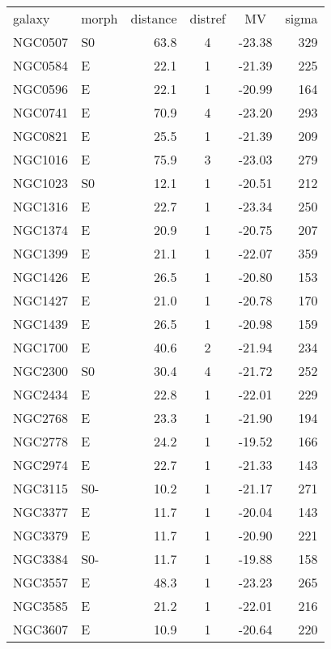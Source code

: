 \begin{tabular}{llrccr}
galaxy  &  morph  &  distance  &  distref  &  MV  &  sigma \\
NGC0507        & S0     &  63.8 & 4 &  -23.38 & 329\\
NGC0584        & E      &  22.1 & 1 &  -21.39 & 225\\
NGC0596        & E      &  22.1 & 1 &  -20.99 & 164\\
NGC0741        & E      &  70.9 & 4 &  -23.20 & 293\\
NGC0821        & E      &  25.5 & 1 &  -21.39 & 209\\
NGC1016        & E      &  75.9 & 3 &  -23.03 & 279\\
NGC1023        & S0     &  12.1 & 1 &  -20.51 & 212\\
NGC1316        & E      &  22.7 & 1 &  -23.34 & 250\\
NGC1374        & E      &  20.9 & 1 &  -20.75 & 207\\
NGC1399        & E      &  21.1 & 1 &  -22.07 & 359\\
NGC1426        & E      &  26.5 & 1 &  -20.80 & 153\\
NGC1427        & E      &  21.0 & 1 &  -20.78 & 170\\
NGC1439        & E      &  26.5 & 1 &  -20.98 & 159\\
NGC1700        & E      &  40.6 & 2 &  -21.94 & 234\\
NGC2300        & S0     &  30.4 & 4 &  -21.72 & 252\\
NGC2434        & E      &  22.8 & 1 &  -22.01 & 229\\
NGC2768        & E      &  23.3 & 1 &  -21.90 & 194\\
NGC2778        & E      &  24.2 & 1 &  -19.52 & 166\\
NGC2974        & E      &  22.7 & 1 &  -21.33 & 143\\
NGC3115        & S0-    &  10.2 & 1 &  -21.17 & 271\\
NGC3377        & E      &  11.7 & 1 &  -20.04 & 143\\
NGC3379        & E      &  11.7 & 1 &  -20.90 & 221\\
NGC3384        & S0-    &  11.7 & 1 &  -19.88 & 158\\
NGC3557        & E      &  48.3 & 1 &  -23.23 & 265\\
NGC3585        & E      &  21.2 & 1 &  -22.01 & 216\\
NGC3607        & E      &  10.9 & 1 &  -20.64 & 220\\

\end{tabular}
